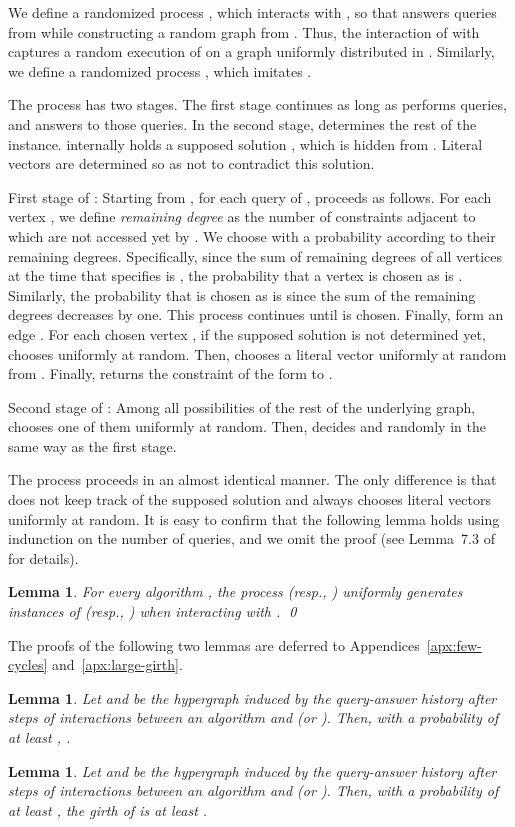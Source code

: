 \documentclass[letterpaper,11pt]{article}
\newtheorem{lemma}[theorem]{Lemma}
\begin{document}
We define a randomized process , which interacts with , 
so that  answers queries from  while constructing a random graph from .
Thus, the interaction of  with  captures a random execution of  on a graph uniformly distributed in .
Similarly, we define a randomized process , which imitates .

The process  has two stages.
The first stage continues as long as  performs queries, and  answers to those queries.
In the second stage,  determines the rest of the instance.
 internally holds a supposed solution , 
which is hidden from .
Literal vectors are determined so as not to contradict this solution.

First stage of :
Starting from , 
for each query  of ,  proceeds as follows.
For each vertex , 
we define \textit{remaining degree}  as the number of constraints adjacent to  which are not accessed yet by .
We choose  with a probability according to their remaining degrees.
Specifically, 
since the sum of remaining degrees of all vertices at the time that  specifies  is ,
the probability that a vertex  is chosen as  is .
Similarly, the probability that  is chosen as  is  since the sum of the remaining degrees decreases by one.
This process continues until  is chosen.
Finally, form an edge .
For each chosen vertex , 
if the supposed solution  is not determined yet,
 chooses  uniformly at random.
Then,  chooses a literal vector  uniformly at random from .
Finally,  returns the constraint  of the form  to .

Second stage of :
Among all possibilities of the rest of the underlying graph,
 chooses one of them uniformly at random.
Then,  decides  and  randomly in the same way as the first stage.

The process  proceeds in an almost identical manner.
The only difference is that  does not keep track of the supposed solution and always chooses literal vectors uniformly at random.
It is easy to confirm that the following lemma holds using indunction on the number of queries,
and we omit the proof (see Lemma~7.3 of~\cite{GR08} for details).
\begin{lemma}\label{lmm:equivalent}
  For every algorithm , the process  (resp., ) uniformly generates instances of  (resp., ) when interacting with .
  \qed
\end{lemma}
The proofs of the following two lemmas are deferred to Appendices~\ref{apx:few-cycles} and~\ref{apx:large-girth}.
\begin{lemma}\label{lmm:few-cycles}
  Let  and  be the hypergraph induced by the query-answer history after  steps of interactions between an algorithm  and  (or ).
  Then, with a probability of at least , .
\end{lemma}
\begin{lemma}\label{lmm:large-girth}
  Let  and  be the hypergraph induced by the query-answer history after  steps of interactions between an algorithm  and  (or ).
  Then, with a probability of at least , 
  the girth of  is at least .
\end{lemma}
\end{document}
